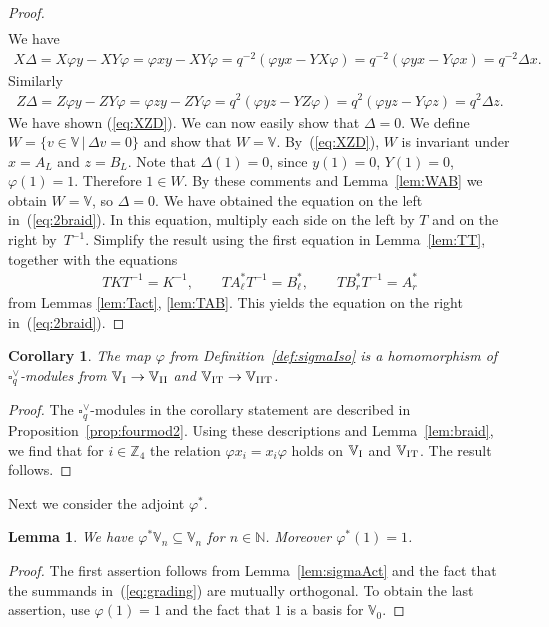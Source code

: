 \documentclass[pdftex]{sigma}
\numberwithin{equation}{section}
\newtheorem{Corollary}[Theorem]{Corollary}
\newtheorem{Lemma}[Theorem]{Lemma}
\begin{document}
\begin{proof}
\begin{gather}
\label{eq:XZD}
\end{gather}
We have
\begin{gather*}
X \Delta = X \varphi y - X Y \varphi
= \varphi x y - X Y \varphi
= q^{-2}(\varphi y x - Y X \varphi)
= q^{-2}(\varphi y x - Y \varphi x)
= q^{-2}\Delta x.
\end{gather*}
Similarly
\begin{gather*}
Z \Delta = Z \varphi y - Z Y \varphi
= \varphi z y - Z Y \varphi
= q^{2}(\varphi y z - Y Z \varphi)
= q^{2}(\varphi y z - Y \varphi z)
= q^{2}\Delta z.
\end{gather*}
We have shown (\ref{eq:XZD}). We can now easily show that $\Delta = 0$. We define $W=\lbrace v \in \mathbb V\,|\, \Delta v = 0\rbrace$ and show that $W=\mathbb V$. By~(\ref{eq:XZD}), $W$ is invariant under $x=A_L$ and $z=B_L$. Note that $\Delta (1)=0$, since $y(1)=0$, $Y(1)=0$, $\varphi (1)=1$. Therefore $1 \in W$.
By these comments and Lemma~\ref{lem:WAB} we obtain $W=\mathbb V$, so $\Delta=0$. We have obtained
the equation on the left in~(\ref{eq:2braid}). In this equation, multiply each side on the left by $T$ and on the right by~$T^{-1}$. Simplify the result using the first equation in Lemma~\ref{lem:TT}, together with the equations
\begin{gather*}
TKT^{-1}= K^{-1},\qquad T A^*_\ell T^{-1} = B^*_{\ell},\qquad T B^*_r T^{-1} = A^*_r
\end{gather*}
from Lemmas \ref{lem:Tact}, \ref{lem:TAB}. This yields the equation on the right in~(\ref{eq:2braid}).
\end{proof}

\begin{Corollary}\label{cor:hom}The map $\varphi$ from Definition~{\rm \ref{def:sigmaIso}} is a homomorphism of $\square^\vee_q$-modules from $\mathbb V_{\rm I} \to \mathbb V_{\rm II}$ and $\mathbb V_{\rm IT} \to \mathbb V_{\rm IIT}$.
\end{Corollary}
\begin{proof}The $\square^\vee_q$-modules in the corollary statement are described in Proposition~\ref{prop:fourmod2}. Using these descriptions and Lemma~\ref{lem:braid}, we find that for $i \in \mathbb Z_4$ the relation $ \varphi x_i = x_i \varphi$ holds on $\mathbb V_{\rm I}$ and $\mathbb V_{\rm IT}$. The result follows.
\end{proof}

Next we consider the adjoint $\varphi^*$.

\begin{Lemma}\label{lem:adjphi} We have $\varphi^* \mathbb V_n \subseteq \mathbb V_n$ for $n \in \mathbb N$. Moreover $\varphi^*(1)=1$.
\end{Lemma}
\begin{proof} The first assertion follows from Lemma~\ref{lem:sigmaAct} and the fact that the summands in~(\ref{eq:grading}) are mutually orthogonal. To obtain the last assertion, use $\varphi(1)=1$ and the
fact that $1$ is a basis for $\mathbb V_0$.
\end{proof}
\end{document}
